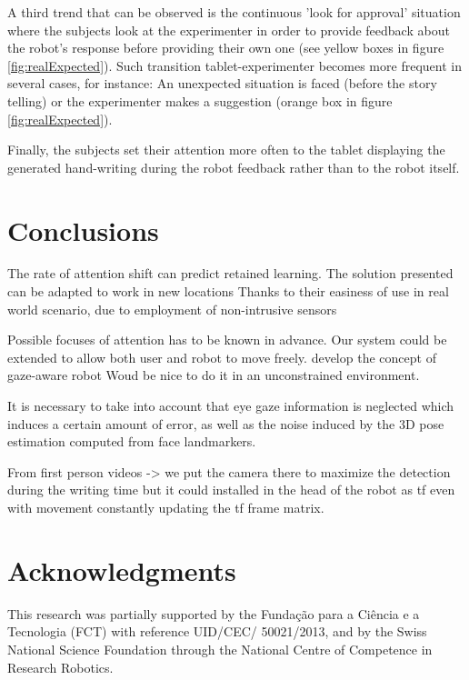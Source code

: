 \documentclass{sig-alternate}
\begin{document}
A third trend that can be observed is the continuous 'look for approval' situation where the subjects look at the experimenter in order to provide feedback about the robot's response before providing their own one (see yellow boxes in figure \ref{fig:realExpected}). Such transition tablet-experimenter becomes more frequent in several cases, for instance: An unexpected situation is faced (before the story telling) or the experimenter makes a suggestion (orange box in figure \ref{fig:realExpected}).

Finally, the subjects set their attention more often to the tablet displaying the generated hand-writing during the robot feedback rather than to the robot itself. 





\section{Conclusions}
The rate of attention shift can predict retained learning.
The solution presented can be adapted to work in new locations
Thanks to their easiness of use in real world scenario, due to employment of non-intrusive sensors



Possible focuses of attention has to be known in advance.  
Our system could be extended to allow both user and robot to move freely.
develop the concept of gaze-aware robot Woud be nice to do it in an unconstrained environment.

It is necessary to take into account that eye gaze information is neglected which induces a certain amount of error, as well as the noise induced by the 3D pose estimation computed from face landmarkers.

From first person videos -> we put the camera there to maximize the detection during the writing time but it could installed in the head of the robot as tf even with movement constantly updating the tf frame matrix.


\section*{Acknowledgments}
This research was partially supported by the Funda\c{c}\~{a}o para a Ci\^{e}ncia
e a Tecnologia (FCT) with reference UID/CEC/ 50021/2013, and by the Swiss
National Science Foundation through the National Centre of Competence in
Research Robotics.



\end{document}

